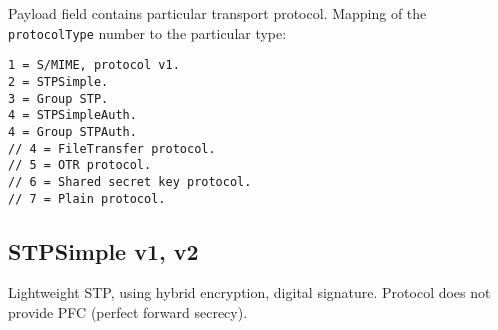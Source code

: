 \documentclass[a4paper,10pt]{article}
\begin{document}
Payload field contains particular transport protocol. Mapping of the \verb#protocolType# number to the particular type:\\
\begin{Verbatim}[frame=single]
1 = S/MIME, protocol v1.
2 = STPSimple.
3 = Group STP.
4 = STPSimpleAuth. 
4 = Group STPAuth.
// 4 = FileTransfer protocol.
// 5 = OTR protocol.
// 6 = Shared secret key protocol.
// 7 = Plain protocol.
\end{Verbatim} 

\subsection{STPSimple v1, v2}
Lightweight STP, using hybrid encryption, digital signature. Protocol does not provide PFC (perfect forward secrecy).
\end{document}
